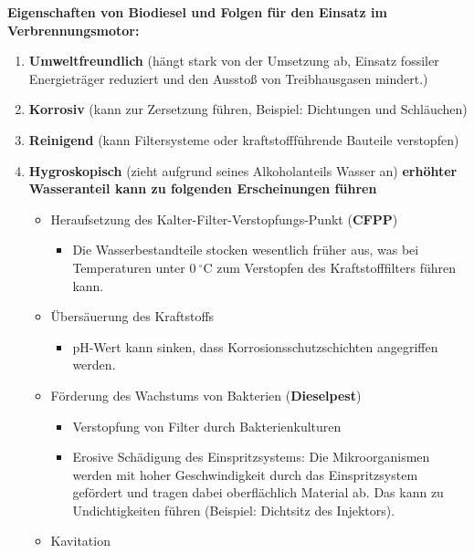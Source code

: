 \textbf{Eigenschaften von Biodiesel und Folgen für den Einsatz im
Verbrennungsmotor:}

\begin{enumerate}
\item
  \textbf{Umweltfreundlich} (hängt stark von der Umsetzung ab, Einsatz
  fossiler Energieträger reduziert und den Ausstoß von Treibhausgasen
  mindert.)
\item
  \textbf{Korrosiv} (kann zur Zersetzung führen, Beispiel: Dichtungen
  und Schläuchen)
\item
  \textbf{Reinigend} (kann Filtersysteme oder kraftstoffführende
  Bauteile verstopfen)
\item
  \textbf{Hygroskopisch} (zieht aufgrund seines Alkoholanteils Wasser
  an) \textbf{erhöhter Wasseranteil kann zu folgenden Erscheinungen
  führen}

  \begin{itemize}
  \item
    Heraufsetzung des Kalter-Filter-Verstopfungs-Punkt (\textbf{CFPP})

    \begin{itemize}
    \item
      Die Wasserbestandteile stocken wesentlich früher aus, was bei
      Temperaturen unter $0~^\circ\text{C}$ zum Verstopfen des
      Kraftstofffilters führen kann.
    \end{itemize}
  \item
    Übersäuerung des Kraftstoffs

    \begin{itemize}
    \item
      pH-Wert kann sinken, dass Korrosionsschutzschichten angegriffen
      werden.
    \end{itemize}
  \item
    Förderung des Wachstums von Bakterien (\textbf{Dieselpest})

    \begin{itemize}
    \item
      Verstopfung von Filter durch Bakterienkulturen
    \item
      Erosive Schädigung des Einspritzsystems: Die Mikroorganismen
      werden mit hoher Geschwindigkeit durch das Einspritzsystem
      gefördert und tragen dabei oberflächlich Material ab. Das kann zu
      Undichtigkeiten führen (Beispiel: Dichtsitz des Injektors).
    \end{itemize}
  \item
    Kavitation


\end{itemize}
\end{enumerate}
